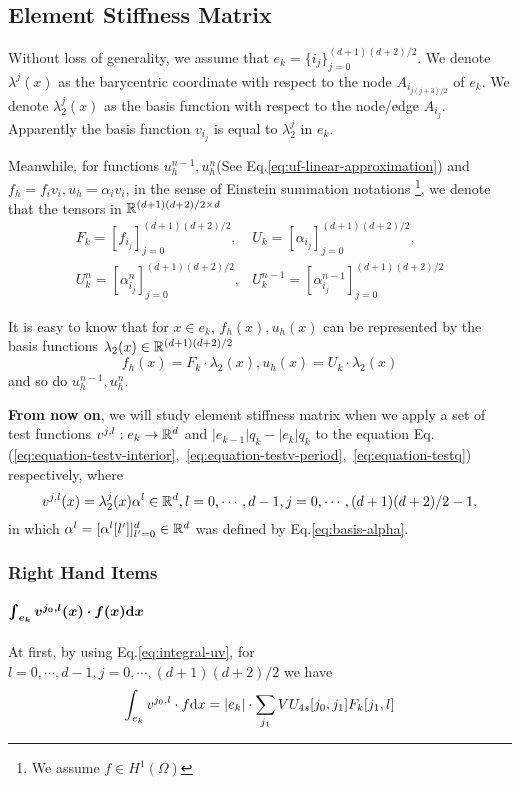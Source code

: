 \subsection{Element Stiffness Matrix}
Without loss of generality, we assume that $e_k=\{i_j\}_{j=0}^{(d+1)(d+2)/2}$.
We denote $\lambda^j(x)$ as the barycentric coordinate with respect to 
the node $A_{i_{j(j+3)/2}}$ of $e_k$. 
We denote $\lambda^j_2(x)$ as the basis function with respect to 
the node/edge $A_{i_j}$.
Apparently the basis function $v_{i_j}$ is equal to $\lambda^j_2$ in $e_k$.

Meanwhile, for functions $u_h^{n-1},u_h^n$(See Eq.\eqref{eq:uf-linear-approximation}) 
and $f_h=f_iv_i,u_h=\alpha_iv_i$, 
in the sense of Einstein summation notations
\footnote{We assume $f\in H^1(\Omega)$}, 
we denote that the tensors in $\mathbb{R}^{(d+1)(d+2)/2\times d}$
\[
  \begin{split}
    F_k=[f_{i_j}]_{j=0}^{(d+1)(d+2)/2},& U_k=[\alpha_{i_j}]_{j=0}^{(d+1)(d+2)/2},\\
    U_{k}^{n}=[\alpha_{i_j}^{n}]_{j=0}^{(d+1)(d+2)/2}, &
    U_{k}^{n-1}=[\alpha_{i_j}^{n-1}]_{j=0}^{(d+1)(d+2)/2} 
  \end{split}
\]

It is easy to know that for $x\in e_k$, $f_h(x),u_h(x)$ can be represented by 
the basis functions $\lambda_2(x)\in\mathbb{R}^{(d+1)(d+2)/2}$
\[f_h(x)=F_k\cdot\lambda_2(x),u_h(x)=U_k\cdot\lambda_2(x)\]
and so do $u_h^{n-1},u_h^n$. 

\textbf{From now on}, we will study element stiffness matrix when we apply 
a set of test functions $v^{j,l}:e_k\to\mathbb{R}^{d}$ and 
$|e_{k-1}|q_k-|e_k|q_k$ to the equation 
Eq.(\ref{eq:equation-testv-interior},~\ref{eq:equation-testv-period},~\ref{eq:equation-testq}) respectively, where
\[v^{j,l}(x)=\lambda_2^j(x)\alpha^l\in\mathbb{R}^{d},l=0,\cdots,d-1,j=0,\cdots,(d+1)(d+2)/2-1,\]
in which $\alpha^l=[\alpha^l[l']]_{l'=0}^d\in\mathbb{R}^{d}$ 
was defined by Eq.\eqref{eq:basis-alpha}.

\subsubsection{Right Hand Items}
\paragraph{$\bm{\int_{e_k}v^{j_0,l}(x)\cdot f(x)\mathrm{d} x}$}
At first, by using Eq.\eqref{eq:integral-uv}, for 
$l=0,\cdots,d-1,j=0,\cdots,(d+1)(d+2)/2$ we have
\begin{equation}
  \int_{e_k}v^{j_0,l}\cdot f\mathrm{d} x = |e_k|\cdot \sum_{j_1}VU_{4s}[j_0,j_1]F_k[j_1,l]
\end{equation}

